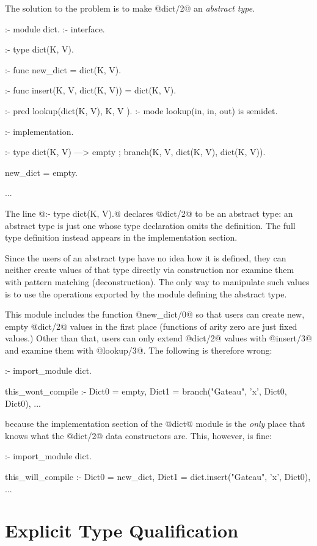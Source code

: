 The solution to the problem is to make @dict/2@ an \emph{abstract type}.
\begin{myverbatim}
:- module dict.
:- interface.


:- type dict(K, V).     %

:- func new_dict = dict(K, V).

:- func insert(K, V, dict(K, V)) = dict(K, V).

:- pred lookup(dict(K, V), K,  V  ).
:- mode lookup(in,         in, out) is semidet.


:- implementation.


:- type dict(K, V)      %
    --->    empty
    ;       branch(K, V, dict(K, V), dict(K, V)).

new_dict = empty.

...
\end{myverbatim}
The line @:- type dict(K, V).@ declares @dict/2@ to be an abstract type:
an abstract type is just one whose type declaration omits the definition.
The full type definition instead appears in the implementation section.

Since the users of an abstract type have no idea how it is defined, they can
neither create values of that type directly via construction nor examine
them with pattern matching (deconstruction).  The only way to manipulate
such values is to use the operations exported by the module defining the
abstract type.

This module includes the function @new_dict/0@ so that users can create new,
empty @dict/2@ values in the first place (functions of arity zero are just
fixed values.)
Other than that, users can only extend @dict/2@ values with @insert/3@ and
examine them with @lookup/3@.
The following is therefore wrong:
\begin{myverbatim}
:- import_module dict.

this_wont_compile :-
    Dict0 = empty,
    Dict1 = branch("Gateau", 'x', Dict0, Dict0),
    ...
\end{myverbatim}
because the implementation section of the @dict@ module is the \emph{only}
place that knows what the @dict/2@ data constructors are.  This, however, 
is fine:
\begin{myverbatim}
:- import_module dict.

this_will_compile :-
    Dict0 = new_dict,
    Dict1 = dict.insert("Gateau", 'x', Dict0),
    ...
\end{myverbatim}

\section{Explicit Type Qualification}

